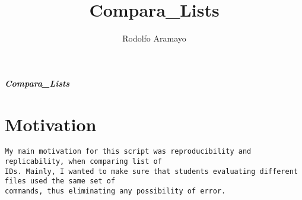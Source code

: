 \documentclass[11pt]{article}
\author{Rodolfo Aramayo}
\date{}
\title{Compara\_Lists}
\begin{document}
\eject
{}

\pdfpagewidth=8.5in \pdfpageheight=11in



\begin{center} \emph{\textbf{\huge {Compara\_Lists}}}\end{center}
\section*{Motivation}
\label{sec:org67ca743}
\begin{verbatim}
My main motivation for this script was reproducibility and replicability, when comparing list of
IDs. Mainly, I wanted to make sure that students evaluating different files used the same set of
commands, thus eliminating any possibility of error.
\end{verbatim}
\noindent\makebox[\linewidth]{\rule{\paperwidth}{0.5pt}}
\end{document}
